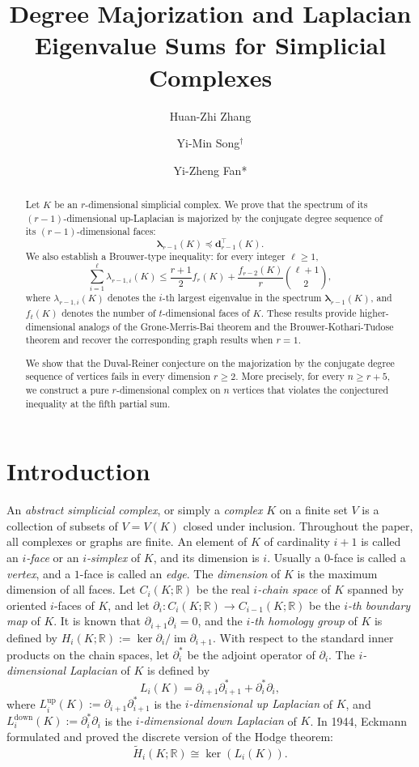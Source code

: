 \documentclass[12pt]{amsart}
\title[Laplacian Eigenvalue Sums of Complexes]{Degree Majorization and Laplacian Eigenvalue Sums for Simplicial Complexes}
\author [H.-Z. Zhang]{Huan-Zhi Zhang}
\author[Y.-M. Song]{Yi-Min Song$^\dag$}
\author [Y.-Z. Fan]{Yi-Zheng Fan*}
\theoremstyle{plain}
\theoremstyle{definition}
\numberwithin{equation}{section}
\numberwithin{figure}{section}
\newcommand{\bflam}{\bm{\lambda}}
\newcommand{\dd}{\mathbf d}
\newcommand{\im}{\operatorname{im}}
\newcommand{\Ldown}{L^{\operatorname{down}}}
\newcommand{\Lup}{L^{\operatorname{up}}}
\newcommand{\p}{\partial}
\newcommand{\pre}{\preccurlyeq}
\newcommand{\R}{\mathbb R}
\begin{document}
\begin{abstract}
Let $K$ be an $r$-dimensional simplicial complex.
We prove that the spectrum of its $(r - 1)$-dimensional up-Laplacian is majorized by the conjugate degree sequence of its $(r - 1)$-dimensional faces:
\[
\bflam_{r-1}(K) \pre \dd_{r-1}^\top(K).
\]
We also establish a Brouwer-type inequality: for every integer $\ell \geq 1$,
\[
\sum_{i = 1}^{\ell}\lambda_{r-1,i}(K)
\leq
\frac{r + 1}{2}f_r(K)
+
\frac{f_{r - 2}(K)}{r}
\binom{\ell + 1}{2},
\]
where $\lambda_{r-1,i}(K)$ denotes the $i$-th largest eigenvalue in the spectrum $\bflam_{r-1}(K)$, and $f_t(K)$ denotes the number of $t$-dimensional faces of $K$.
These results provide higher-dimensional analogs of the
Grone-Merris-Bai theorem and the Brouwer-Kothari-Tudose theorem 
and recover the corresponding graph results when $r=1$.

We show that the Duval-Reiner conjecture on the majorization by the conjugate degree sequence of vertices fails in every dimension $r \geq 2$.
More precisely, for every $n \geq r + 5$, we construct a pure $r$-dimensional complex on $n$ vertices that violates the conjectured inequality at the fifth partial sum.
\end{abstract}

\maketitle

\section{Introduction}
An \emph{abstract simplicial complex}, or simply a \emph{complex} $K$ on a finite set $V$ is a collection of subsets of $V=V(K)$ closed under inclusion. 
Throughout the paper, all complexes or graphs are finite.
An element of $K$ of cardinality $i+1$ is called an \emph{$i$-face} or an \emph{$i$-simplex} of $K$, and its dimension is $i$.
Usually a $0$-face is called a \emph{vertex}, and a $1$-face is called an \emph{edge}.
The \emph{dimension} of $K$ is the maximum dimension of all faces.
Let $C_i(K;\R)$ be the real \emph{$i$-chain space} of $K$ spanned by oriented $i$-faces of $K$, and let $\p_i: C_i(K;\R)\to C_{i-1}(K;\R)$ be the \emph{$i$-th boundary map} of $K$.
It is known that $\p_{i+1}\p_i =0$, and the \emph{$i$-th homology group} of $K$ is defined by $H_i(K;\R):=\ker \p_i / \im \p_{i+1}$.
With respect to the standard inner products on the chain spaces, let $\p_i^*$ be the adjoint operator of $\p_i$.
The \emph{$i$-dimensional Laplacian} of $K$ is defined by
\[
L_i(K) = \p_{i + 1}\p_{i + 1}^{*} + \p_i^{*}\p_i,
\]
where $\Lup_i(K):=\p_{i + 1}\p_{i + 1}^{*}$ is the \emph{$i$-dimensional up Laplacian} of $K$, and $\Ldown_i(K):=\p_i^{*}\p_i$ is the \emph{$i$-dimensional down Laplacian} of $K$.
In 1944, Eckmann \cite{E1944} formulated and proved the discrete version of the Hodge theorem:
\[
\widetilde H_i(K;\R) \cong \ker(L_i(K)).
\]
\end{document}
